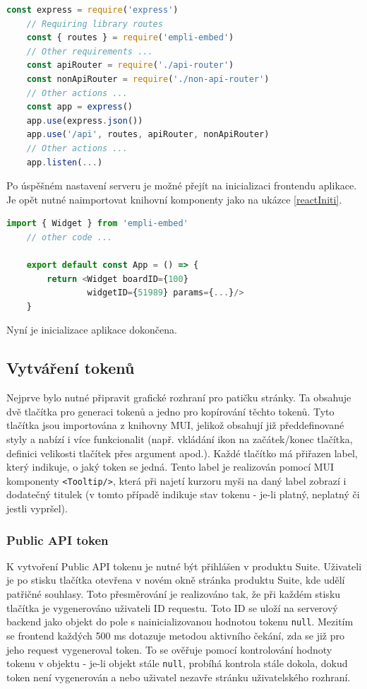 \documentclass[czech, bc, kiv, he, iso690numb]{fasthesis}
\begin{document}
\begin{lstlisting}[language=Javascript, caption={Inicializace Express serveru}, label=expressInit]
	const express = require('express')
	// Requiring library routes
	const { routes } = require('empli-embed') 
	// Other requirements ...
	const apiRouter = require('./api-router')
	const nonApiRouter = require('./non-api-router')
	// Other actions ...
	const app = express()
	app.use(express.json())
	app.use('/api', routes, apiRouter, nonApiRouter)
	// Other actions ...
	app.listen(...)
\end{lstlisting}

Po úspěšném nastavení serveru je možné přejít na inicializaci frontendu aplikace. Je opět nutné naimportovat knihovní komponenty jako na ukázce \ref{reactIniti}.
\begin{lstlisting}[language=Javascript, caption={Inicializace React komponenty}, label=reactIniti]
	import { Widget } from 'empli-embed'
	// other code ...

	export default const App = () => {
		return <Widget boardID={100} 
				widgetID={51989} params={...}/>
	}
\end{lstlisting}

Nyní je inicializace aplikace dokončena. 

\subsection{Vytváření tokenů}

Nejprve bylo nutné připravit grafické rozhraní pro patičku stránky. Ta obsahuje dvě tlačítka pro generaci tokenů a jedno pro kopírování těchto tokenů. Tyto tlačítka
jsou importována z knihovny MUI, jelikož obsahují již předdefinované styly a nabízí i více funkcionalit (např. vkládání ikon na začátek/konec tlačítka, definici velikosti
tlačítek přes argument apod.). Každé tlačítko má přiřazen label, který indikuje, o jaký token se jedná. Tento label je realizován pomocí MUI komponenty
\texttt{<Tooltip/>}, která při najetí kurzoru myši na daný label zobrazí i dodatečný titulek (v tomto případě indikuje stav tokenu - je-li platný, neplatný či jestli vypršel).


\subsubsection{Public API token}
K vytvoření Public API tokenu je nutné být přihlášen v produktu Suite. Uživateli je po stisku tlačítka otevřena v novém okně stránka produktu Suite, kde udělí patřičné souhlasy. 
Toto přesměrování je realizováno tak, že při každém stisku tlačítka je vygenerováno uživateli ID requestu. Toto ID se uloží na serverový backend jako objekt do pole s nainicializovanou
hodnotou tokenu \texttt{null}. Mezitím se frontend každých 500 ms dotazuje metodou aktivního čekání, zda se již pro jeho request vygeneroval token. To se ověřuje pomocí kontrolování hodnoty
tokenu v objektu - je-li objekt stále \texttt{null}, probíhá kontrola stále dokola, dokud token není vygenerován a nebo uživatel nezavře stránku uživatelského rozhraní.
\end{document}
